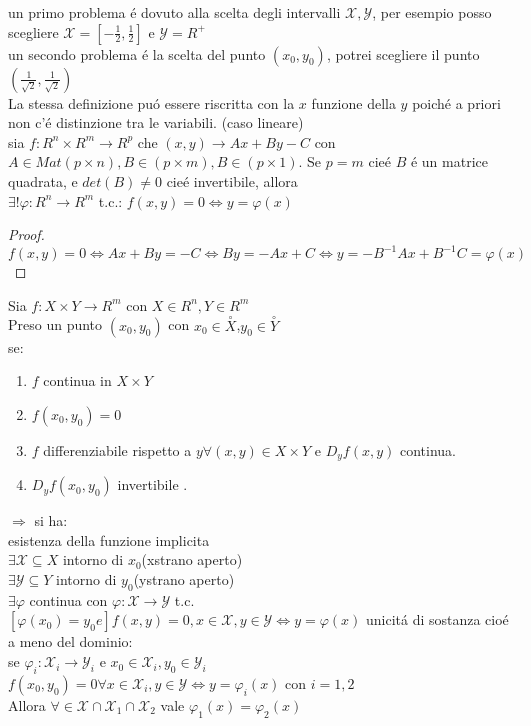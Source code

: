 	un primo problema \'e dovuto alla scelta degli intervalli $\mathcal{X},\mathcal{Y}$, per esempio posso scegliere $\mathcal{X}=[-\frac{1}{2},\frac{1}{2}]$ e $\mathcal{Y}=R^+$\\
	un secondo problema \'e la scelta del punto $(x_0,y_0)$, potrei scegliere il punto $(\frac{1}{\sqrt{2}},\frac{1}{\sqrt{2}})$\\
\observation
La stessa definizione pu\'o essere riscritta con la $x$ funzione della $y$ poich\'e a priori non c'\'e distinzione tra le variabili.
\proposition (caso lineare)\\
sia $f:R^n\times R^m\rightarrow R^p$ che $(x,y)\rightarrow Ax+By-C$ con $A\in Mat(p \times n), B\in (p \times m), B\in (p \times 1)$. Se $p=m$ cie\'e $B$ \'e un matrice quadrata, e $det(B)\ne 0$ cie\'e invertibile, allora\\
$\exists !\varphi : R^n\rightarrow R^m$ t.c.: $f(x,y)=0 \Leftrightarrow y=\varphi(x)$
\begin{proof}
	$f(x,y)=0\Leftrightarrow Ax+By=-C\Leftrightarrow By=-Ax+C\Leftrightarrow y=-B^{-1}Ax+B^{-1}C = \varphi(x)$
\end{proof}
\proposition
Sia $f:X\times Y\rightarrow R^m$ con $X\in R^n, Y\in R^m$\\
Preso un punto $(x_0,y_0)$ con $x_0\in \overset{\circ}{X}$,$y_0\in \overset{\circ}{Y}$\\
se:
\begin{enumerate}
	\item $f$ continua in $X\times Y$
	\item $f(x_0,y_0)=0$
	\item $f$ differenziabile rispetto a $y \forall (x,y)\in X\times Y$ e $D_yf(x,y)$ continua.
	\item $D_yf(x_0,y_0)$ invertibile .
\end{enumerate}
$\Rightarrow $ si ha:\\
esistenza della funzione implicita\\
$\exists \mathcal{X}\subseteq X$ intorno di $x_0$(xstrano aperto)\\
$\exists \mathcal{Y}\subseteq Y$ intorno di $y_0$(ystrano aperto)\\
$\exists\varphi$ continua con $\varphi:\mathcal{X}\rightarrow\mathcal{Y}$ t.c. $[\varphi (x_0)=y_0 e] f(x,y)=0, x\in\mathcal{X},y\in\mathcal{Y} \Leftrightarrow y=\varphi(x)$
unicit\'a di sostanza cio\'e a meno del dominio:\\
se $\varphi_i:\mathcal{X}_i\rightarrow\mathcal{Y}_i$ e $x_0\in\mathcal{X}_i,y_0\in\mathcal{Y}_i$\\
$f(x_0,y_0)=0 \forall x\in\mathcal{X}_i, y\in \mathcal{Y}\Leftrightarrow y=\varphi_i(x)$ con $i=1,2$\\
Allora $\forall\in\mathcal{X}\cap\mathcal{X}_1\cap\mathcal{X}_2$ vale $\varphi_1(x)=\varphi_2(x)$

